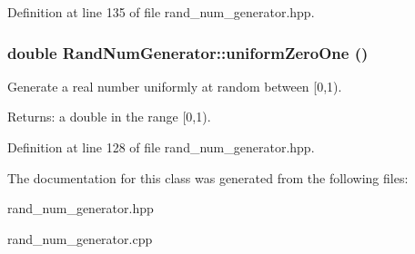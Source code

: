 Definition at line 135 of file rand\_\-num\_\-generator.hpp.
\subsubsection{\setlength{\rightskip}{0pt plus 5cm}double Rand\-Num\-Generator::uniform\-Zero\-One ()\hspace{0.3cm}{\tt  [inline]}}\label{classRandNumGenerator_30eca9cbfae084672a3ef73ccda2d941}


Generate a real number uniformly at random between [0,1). 

\begin{Desc}
\item[Returns:]a double in the range [0,1). \end{Desc}


Definition at line 128 of file rand\_\-num\_\-generator.hpp.

The documentation for this class was generated from the following files:\begin{CompactItemize}
\item 
rand\_\-num\_\-generator.hpp\item 
rand\_\-num\_\-generator.cpp\end{CompactItemize}
